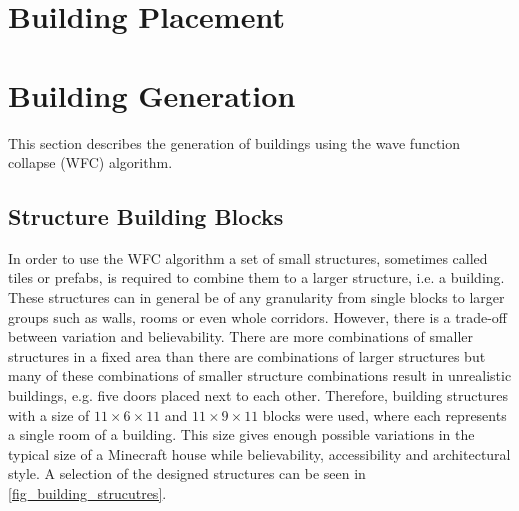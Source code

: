 \documentclass[
oneside,
fontsize=11pt
]{scrartcl}
\begin{document}
\section{Building Placement}




\section{Building Generation}
This section describes the generation of buildings using the wave function collapse (WFC) algorithm.



\subsection{Structure Building Blocks}
In order to use the WFC algorithm a set of small structures, sometimes called tiles or prefabs, 
is required to combine them to a larger structure, i.e. a building. 
These structures can in general be of any granularity from single blocks 
to larger groups such as walls, rooms or even whole corridors. 
However, there is a trade-off between variation and believability.
There are more combinations of smaller structures in a fixed area 
than there are combinations of larger structures 
but many of these combinations of smaller structure combinations 
result in unrealistic buildings, e.g. five doors placed next to each other. 
Therefore, building structures with a size of 
$11 \times 6 \times 11$ and $11 \times 9 \times 11$  blocks 
were used, where each represents a single room of a building.  
This size gives enough possible variations in the typical size of a Minecraft house 
while believability, accessibility and architectural style. 
A selection of the designed structures can be seen in \autoref{fig_building_strucutres}.
\end{document}
